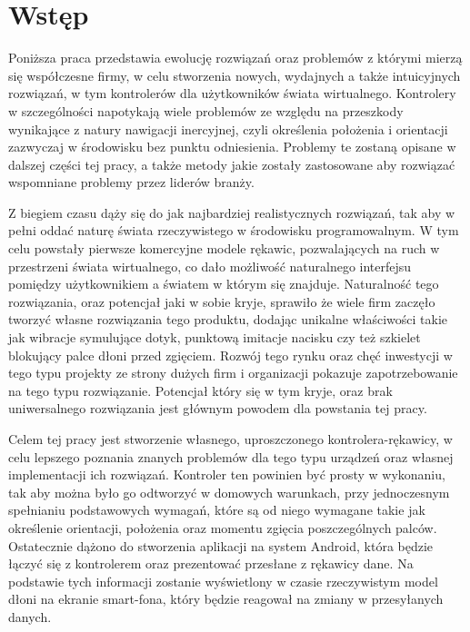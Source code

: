 \chapter*{Wstęp}
\label{ch:wstep}
Poniższa praca przedstawia ewolucję rozwiązań oraz problemów z którymi mierzą się współczesne firmy, w celu stworzenia nowych, wydajnych a także intuicyjnych rozwiązań, w tym kontrolerów dla użytkowników świata wirtualnego. Kontrolery w szczególności napotykają wiele problemów ze względu na przeszkody wynikające z natury nawigacji inercyjnej, czyli określenia położenia i orientacji zazwyczaj w środowisku bez punktu odniesienia. Problemy te zostaną opisane w dalszej części tej pracy, a także metody jakie zostały zastosowane aby rozwiązać wspomniane problemy przez liderów branży.

Z biegiem czasu dąży się do jak najbardziej realistycznych rozwiązań, tak aby w pełni oddać naturę świata rzeczywistego w środowisku programowalnym. W tym celu powstały pierwsze komercyjne modele rękawic, pozwalających na ruch w przestrzeni świata wirtualnego, co dało możliwość naturalnego interfejsu pomiędzy użytkownikiem a światem w którym się znajduje. Naturalność tego rozwiązania, oraz potencjał jaki w sobie kryje, sprawiło że wiele firm zaczęło tworzyć własne rozwiązania tego produktu, dodając unikalne właściwości takie jak wibracje symulujące dotyk, punktową imitacje nacisku czy też szkielet blokujący palce dłoni przed zgięciem. Rozwój tego rynku oraz chęć inwestycji w tego typu projekty ze strony dużych firm i organizacji pokazuje zapotrzebowanie na tego typu rozwiązanie. Potencjał który się w tym kryje, oraz brak uniwersalnego rozwiązania jest głównym powodem dla powstania tej pracy.

Celem tej pracy jest stworzenie własnego, uproszczonego kontrolera-rękawicy, w celu lepszego poznania znanych problemów dla tego typu urządzeń oraz własnej implementacji ich rozwiązań. Kontroler ten powinien być prosty w wykonaniu, tak aby można było go odtworzyć w domowych warunkach, przy jednoczesnym spełnianiu podstawowych wymagań, które są od niego wymagane takie jak określenie orientacji, położenia oraz momentu zgięcia poszczególnych palców. Ostatecznie dążono do stworzenia aplikacji na system Android, która będzie łączyć się z kontrolerem oraz prezentować przesłane z rękawicy dane. Na podstawie tych informacji zostanie wyświetlony w czasie rzeczywistym model dłoni na ekranie smart-fona, który będzie reagował na zmiany w przesyłanych danych.